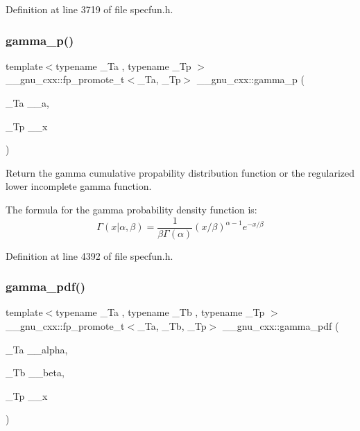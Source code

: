 Definition at line 3719 of file specfun.\+h.

\mbox{\label{group__gnu__math__spec__func_ga692601fa7508c0b97bf549e6362a49b9}} 
\subsubsection{\texorpdfstring{gamma\+\_\+p()}{gamma\_p()}}
{\footnotesize\ttfamily template$<$typename \+\_\+\+Ta , typename \+\_\+\+Tp $>$ \\
\+\_\+\+\_\+gnu\+\_\+cxx\+::fp\+\_\+promote\+\_\+t$<$\+\_\+\+Ta, \+\_\+\+Tp$>$ \+\_\+\+\_\+gnu\+\_\+cxx\+::gamma\+\_\+p (\begin{DoxyParamCaption}\item[{\+\_\+\+Ta}]{\+\_\+\+\_\+a,  }\item[{\+\_\+\+Tp}]{\+\_\+\+\_\+x }\end{DoxyParamCaption})\hspace{0.3cm}{\ttfamily [inline]}}



Return the gamma cumulative propability distribution function or the regularized lower incomplete gamma function. 

The formula for the gamma probability density function is\+: \[ \Gamma(x|\alpha,\beta) = \frac{1}{\beta\Gamma(\alpha)} (x/\beta)^{\alpha - 1} e^{-x/\beta} \] 

Definition at line 4392 of file specfun.\+h.

\mbox{\label{group__gnu__math__spec__func_ga55f530c37387a6c10c601c5838f3be00}} 
\subsubsection{\texorpdfstring{gamma\+\_\+pdf()}{gamma\_pdf()}}
{\footnotesize\ttfamily template$<$typename \+\_\+\+Ta , typename \+\_\+\+Tb , typename \+\_\+\+Tp $>$ \\
\+\_\+\+\_\+gnu\+\_\+cxx\+::fp\+\_\+promote\+\_\+t$<$\+\_\+\+Ta, \+\_\+\+Tb, \+\_\+\+Tp$>$ \+\_\+\+\_\+gnu\+\_\+cxx\+::gamma\+\_\+pdf (\begin{DoxyParamCaption}\item[{\+\_\+\+Ta}]{\+\_\+\+\_\+alpha,  }\item[{\+\_\+\+Tb}]{\+\_\+\+\_\+beta,  }\item[{\+\_\+\+Tp}]{\+\_\+\+\_\+x }\end{DoxyParamCaption})\hspace{0.3cm}{\ttfamily [inline]}}



